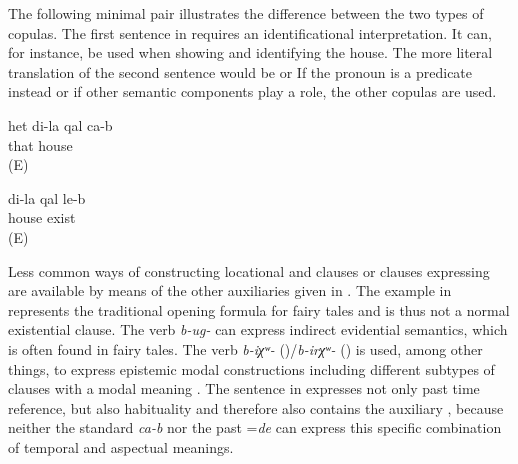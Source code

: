 The following minimal pair illustrates the difference between the two types of copulas. The first sentence in  requires an identificational interpretation. It can, for instance, be used when showing and identifying the house. The more literal translation of the second sentence  would be  or  If the  pronoun is a predicate instead  or if other semantic components play a role, the other copulas are used. 
%
\begin{exe}
	\ex	\label{ex:That is my house}
	\gll	het	di-la	qal	ca-b\\
		that 	house	\\
	\glt	{} (E)

	\ex	\label{ex:I have a house}
	\gll	di-la	qal	le-b\\
			house	exist\\
	\glt	{} (E)
\end{exe}


Less common ways of constructing locational and  clauses or  clauses expressing  are available by means of the other auxiliaries given in . The example in  represents the traditional opening formula for fairy tales and is thus not a normal existential clause. The verb \textit{b-ug-} can express indirect evidential semantics, which is often found in fairy tales. The verb \textit{b-iχʷ-} ()\slash\textit{b-irχʷ-} ()  is used, among other things, to express epistemic modal constructions including different subtypes of  clauses with a modal meaning . The sentence in  expresses not only past time reference, but also habituality and therefore also contains the auxiliary , because neither the standard  \textit{ca-b} nor the past  =\textit{de} can express this specific combination of temporal and aspectual meanings.


